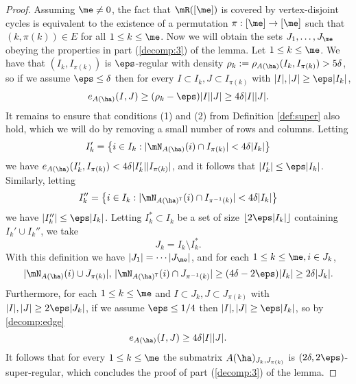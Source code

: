 \documentclass[aop,preprint]{imsart}
\theoremstyle{plain}
\theoremstyle{definition}
\theoremstyle{remark}
\numberwithin{equation}{section}
\numberwithin{theorem}{section}
\def \lf {\lfloor}
\def \rf {\rfloor}
\def \tran {\mathsf{T}}
\begin{document}
\begin{proof}
Assuming $\me \ne 0$, the fact that $\mR([\me ])$ is 
covered by vertex-disjoint cycles
%
is equivalent to the existence of a permutation $\pi:[\me ]\to [\me ]$ such that $(k,\pi(k))\in E$ for all $1\le k\le \me $.
Now we will obtain the sets $J_1,\dots, J_{\me }$ obeying the properties in part (\ref{decomp:3}) of the lemma.
Let $1\le k\le \me $. 
We have that $(I_k,I_{\pi(k)})$ is $\eps$-regular with density $\rho_k:= \rho_{A(\ha)} (I_k,I_{\pi(k)})>5\delta$, so if we assume $\eps\le \delta$ then for every $I\subset I_k, J\subset I_{\pi(k)}$ with $|I|,|J|\ge \eps |I_k|$, 
\begin{equation}	\label{decomp:edge}
e_{A(\ha)}(I,J) \ge (\rho_k-\eps)|I||J| \ge 4\delta |I||J|.
\end{equation}
It remains to ensure that conditions (1) and (2) from Definition \ref{def:super} also hold, which we will do by removing a small number of rows and columns.
%
Letting
\[
I_k' = \big\{ i\in I_k: |\mN_{A(\ha)}(i)\cap I_{\pi(k)}|<4\delta|I_k|\big\}
\]
we have $e_{A(\ha)}(I_k',I_{\pi(k)})<4\delta|I_k'||I_{\pi(k)}|$, and it follows that $|I_k'|\le \eps |I_k|$.
Similarly, letting 
\[
I_k'' = \big\{ i\in I_k: |\mN_{A(\ha)^\tran}(i)\cap I_{\pi^{-1}(k)}|<4\delta|I_k|\big\}
\]
we have $|I_k''|\le \eps |I_k|$.
Letting $I_k^*\subset I_k$ be a set of size $\lf 2\eps|I_k|\rf$ containing $I_k'\cup I_k''$, we take
\begin{equation}	\label{decomp:badcyc}
J_k= I_k\setminus I_k^*.
\end{equation}
With this definition we have $|J_1|=\cdots |J_{\me }|$, and for each $1\le k\le \me , i\in J_k$,
\begin{equation}
|\mN_{A(\ha)}(i)\cup J_{\pi(k)}|, \, |\mN_{A(\ha)^\tran}(i)\cap J_{\pi^{-1}(k)}|\ge (4\delta-2\eps)|I_k|\ge 2\delta|J_k|.
\end{equation}
Furthermore, for each $1\le k\le \me $ and $I\subset J_k, J\subset J_{\pi(k)}$ with $|I|,|J|\ge 2\eps |J_k|$,
if we assume $\eps\le 1/4$ then $|I|,|J|\ge \eps |I_k|$, so by \eqref{decomp:edge}
\begin{equation}
e_{A(\ha)}(I,J) \ge 4\delta|I||J|.
\end{equation}
It follows that for every $1\le k\le \me $ the submatrix $A(\ha)_{J_k,J_{\pi(k)}}$ is $(2\delta,2\eps)$-super-regular, which concludes the proof of part (\ref{decomp:3}) of the lemma.


\end{proof}
\end{document}
